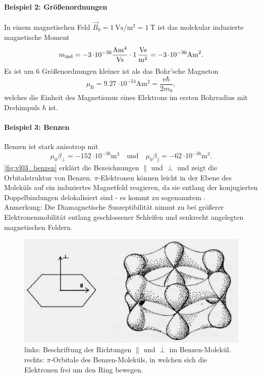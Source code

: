 	\paragraph{Beispiel 2: Größenordnungen} 
	In einem magnetischen Feld $\Vec{B}_{0} = \SI{1}{\volt \second \per \meter \squared } = \SI{1}{\tesla}$ ist das molekular induzierte magnetische Moment
	$$
	m_{\text{ind}} = \SI{-3}{\cdot 10^{-30} \frac{\ampere \meter^4}{\volt \second} } \cdot \SI{1}{ \frac{\volt \second}{\meter^2} }= \SI{-3 }{\cdot 10^{-30} \ampere \meter^2}.
	$$ 
	Es ist um 6 Größenordnungen kleiner ist als das Bohr'sche Magneton
	$$
	\mu_{\text{B}} = \SI{9,27}{\cdot 10^{-24} \ampere \meter^2} = \frac{\mathrm{e} \hbar }{2 m_0},
	$$
	welches die Einheit des Magnetismus eines Elektrons im ersten Bohrradius mit Drehimpuls $\hbar $ ist.\\
	\paragraph{Beispiel 3: Benzen } 
	Benzen ist stark anisotrop mit
	$$
	\mu_0 \beta_{\perp} = \SI{-152}{\cdot 10^{-36} \meter \cubed} \quad \text{und}\quad \mu_0 \beta_{ \|} = \SI{-62}{\cdot 10^{-36}\meter \cubed}.
	$$
	\autoref{fig:vl03_benzen} erklärt die Bezeichnungen $\parallel$ und $\perp$ und zeigt die Orbitalstruktur von Benzen. $\pi$-Elektronen können leicht in der Ebene des Moleküls auf ein induziertes Magnetfeld reagieren, da sie entlang der konjugierten Doppelbindungen delokalisiert sind - es kommt zu sogenanntem .\\
	Anmerkung: Die Diamagnetische Suszeptibilität nimmt zu bei größerer Elektronenmobilität entlang geschlossener Schleifen und senkrecht angelegten magnetischen Feldern.
	\begin{figure}[H]
		\centering
		\includegraphics[width=0.9\linewidth]{figures/vl03/vl03_benzen.png}
		\caption{links: Beschriftung der Richtungen $\parallel$ und $\perp$ im Benzen-Molekül.\\
		rechts: $\pi$-Orbitale des Benzen-Moleküls, in welchen sich die Elektronen frei um den Ring bewegen.}
		\label{fig:vl03_benzen}
	\end{figure}


